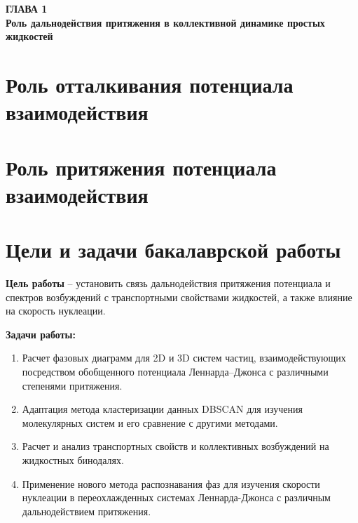 
\newpage
\begin{center}
\textbf{\large ГЛАВА 1 \\ Роль дальнодействия притяжения в коллективной динамике простых жидкостей}
\end{center}



\section{Роль отталкивания потенциала взаимодействия}

\section{Роль притяжения потенциала взаимодействия}


\section{Цели и задачи бакалаврской работы}

\textbf{Цель работы} -- установить связь дальнодействия притяжения потенциала и спектров возбуждений с транспортными свойствами жидкостей, а также влияние на скорость нуклеации.

\textbf{Задачи работы:}
\begin{enumerate}
    \item Расчет фазовых диаграмм для 2D и 3D систем частиц, взаимодействующих посредством обобщенного потенциала Леннарда--Джонса с различными степенями притяжения.
    \item Адаптация метода кластеризации данных DBSCAN для изучения молекулярных систем и его сравнение с другими методами.
    \item Расчет и анализ транспортных свойств и коллективных возбуждений на жидкостных бинодалях.
    \item Применение нового метода распознавания фаз для изучения скорости нуклеации в переохлажденных системах Леннарда-Джонса с различным дальнодействием притяжения.
\end{enumerate}
